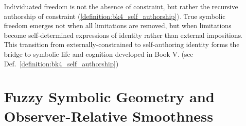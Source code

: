\begin{remark}
\label{remark:bk4_individuated_freedom}
Individuated freedom is not the absence of constraint, but rather the recursive authorship of constraint (\ref{definition:bk4_self_authorship}). True symbolic freedom emerges not when all limitations are removed, but when limitations become self-determined expressions of identity rather than external impositions. This transition from externally-constrained to self-authoring identity forms the bridge to symbolic life and cognition developed in Book V. (see Def.~\ref{definition:bk4_self_authorship})
\end{remark}
\section{Fuzzy Symbolic Geometry and Observer-Relative Smoothness}
\label{sec:bk4_fuzzy_symbolic_geometry_observer_relative_smoothness}
